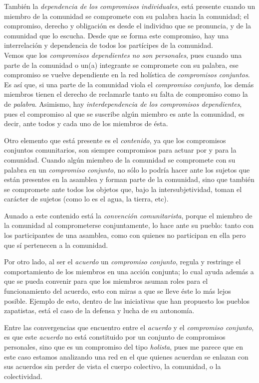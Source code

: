 \documentclass[oneside]{book}
\begin{document}
También la \textit{dependencia de los compromisos individuales}, está presente cuando un miembro de la comunidad se compromete con su palabra hacia la comunidad; el compromiso, derecho y obligación es desde el individuo que se pronuncia, y de la comunidad que lo escucha. Desde que se forma este compromiso, hay una interrelación y dependencia de todos los partícipes de la comunidad.
\\

Vemos que los \textit{compromisos dependientes no son personales}, pues cuando una parte de la comunidad o un(a) integrante se compromete con su palabra, ese compromiso se vuelve dependiente en la red holística de \textit{compromisos conjuntos}. Es así que, si una parte de la comunidad viola el \textit{compromiso conjunto}, los demás miembros tienen el derecho de reclamarle tanto su falta de compromiso como la de \textit{palabra}. Asimismo, hay \textit{interdependencia de los compromisos dependientes}, pues el compromiso al que se suscribe algún miembro es ante la comunidad, es decir, ante todos y cada uno de los miembros de ésta.
	
Otro elemento que está presente es el \textit{contenido}, ya que los compromisos conjuntos comunitarios, son siempre compromisos para actuar por y para la comunidad. Cuando algún miembro de la comunidad se compromete con su palabra en un \textit{compromiso conjunto}, no sólo lo podría hacer ante los sujetos que están presentes en la asamblea y forman parte de la comunidad, sino que también se compromete ante todos los objetos que, bajo la intersubjetividad, toman el carácter de sujetos (como lo es el agua, la tierra, etc).
	
Aunado a este contenido está la \textit{convención comunitarista}, porque el miembro de la comunidad al comprometerse conjuntamente, lo hace ante su pueblo: tanto con los participantes de una asamblea, como con quienes no participan en ella pero que sí pertenecen a la comunidad.
	
Por otro lado, al ser el \textit{acuerdo} un \textit{compromiso conjunto}, regula y restringe el comportamiento de los miembros en una acción conjunta; lo cual ayuda además a que se pueda convenir para que los miembros asuman roles para el funcionamiento del acuerdo, esto con miras a que se lleve éste lo más lejos posible. Ejemplo de esto, dentro de las  iniciativas que han propuesto los pueblos zapatistas, está el caso de la defensa y lucha de su autonomía.
	
Entre las convergencias que encuentro entre el \textit{acuerdo} y el \textit{compromiso conjunto}, es que este \textit{acuerdo} no está constituido por un conjunto de compromisos personales, sino que es un compromiso del tipo \textit{holista}, pues me parece que en este caso estamos analizando una red en el que quienes acuerdan se enlazan con sus acuerdos sin perder de vista el cuerpo colectivo, la comunidad, o la colectividad. 
	
\end{document}
